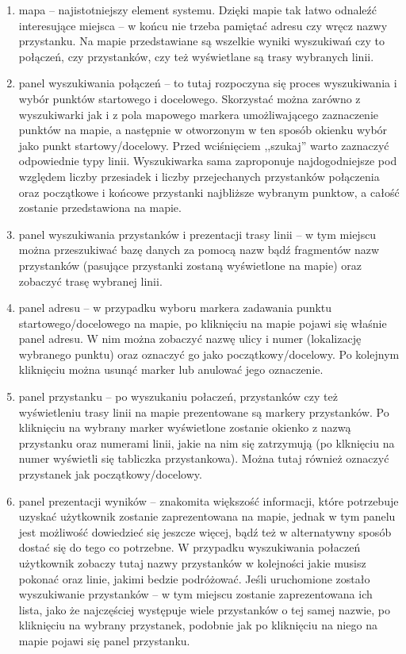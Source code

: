 \documentclass[a4paper,12pt]{article}
\begin{document}
 \begin{enumerate}
	\item mapa -- najistotniejszy element systemu. Dzięki mapie tak łatwo odnaleźć
	interesujące miejsca -- w końcu nie trzeba pamiętać adresu czy wręcz nazwy
	przystanku. Na mapie przedstawiane są wszelkie wyniki wyszukiwań czy to
	połączeń, czy przystanków, czy też wyświetlane są trasy wybranych linii.
   \item panel wyszukiwania połączeń -- to tutaj rozpoczyna się proces
   wyszukiwania i wybór punktów startowego i docelowego. Skorzystać można
   zarówno z wyszukiwarki jak i z pola mapowego markera umożliwającego
   zaznaczenie punktów na mapie, a następnie w otworzonym w ten sposób okienku
   wybór jako punkt startowy/docelowy. Przed wciśnięciem ,,szukaj'' warto
   zaznaczyć odpowiednie typy linii. Wyszukiwarka sama zaproponuje
   najdogodniejsze pod względem liczby przesiadek i liczby przejechanych
   przystanków połączenia oraz początkowe i końcowe przystanki najbliższe
   wybranym punktow, a całość zostanie przedstawiona na mapie.
   \item panel wyszukiwania przystanków i prezentacji trasy linii -- w tym
   miejscu można przeszukiwać bazę danych za pomocą nazw bądź fragmentów nazw
   przystanków (pasujące przystanki zostaną wyświetlone na mapie) oraz zobaczyć
   trasę wybranej linii.
   \item panel adresu -- w przypadku wyboru markera zadawania punktu
   startowego/docelowego na mapie, po kliknięciu na mapie pojawi się właśnie
   panel adresu. W nim można zobaczyć nazwę ulicy i numer (lokalizację
   wybranego punktu) oraz oznaczyć go jako początkowy/docelowy. Po kolejnym 
   kliknięciu można usunąć marker lub anulować jego oznaczenie.
   \item panel przystanku -- po wyszukaniu połaczeń, przystanków czy też
   wyświetleniu trasy linii na mapie prezentowane są markery przystanków. Po
   kliknięciu na wybrany marker wyświetlone zostanie okienko z nazwą przystanku
   oraz numerami linii, jakie na nim się zatrzymują (po klknięciu na numer
   wyświetli się tabliczka przystankowa). Można tutaj również oznaczyć
   przystanek jak początkowy/docelowy.
   \item panel prezentacji wyników -- znakomita większość informacji, które
   potrzebuje uzyskać użytkownik zostanie zaprezentowana na mapie, jednak w tym
   panelu jest możliwość dowiedzieć się jeszcze więcej, bądź też w
   alternatywny sposób dostać się do tego co potrzebne. W przypadku
   wyszukiwania połaczeń użytkownik zobaczy tutaj nazwy przystanków w kolejności
   jakie musisz pokonać oraz linie, jakimi bedzie podróżować. Jeśli uruchomione
   zostało wyszukiwanie przystanków -- w tym miejscu zostanie zaprezentowana
   ich lista, jako że najczęściej występuje wiele przystanków o tej samej
   nazwie, po kliknięciu na wybrany przystanek, podobnie jak po kliknięciu na
   niego na mapie pojawi się panel przystanku.
 \end{enumerate}
 
\end{document}
